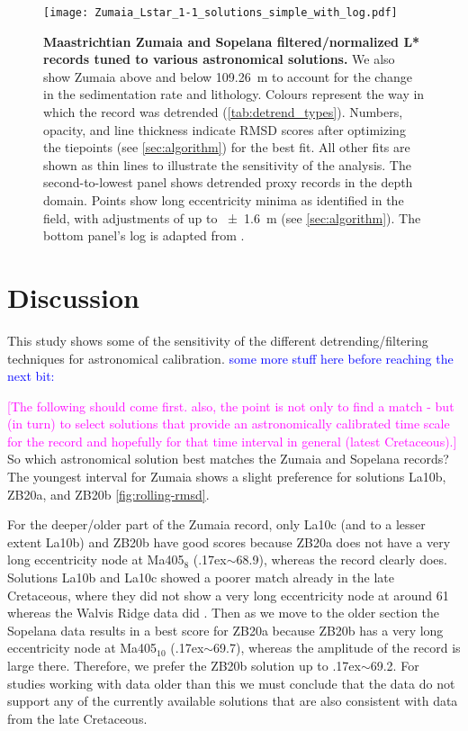 \documentclass[draft]{agujournal2019}
\newcommand{\appr}{\raise.17ex\hbox{$\scriptstyle\sim$}} %
\newcommand{\rez}{\textcolor{magenta}}
\newcommand{\ijk}{\textcolor{blue}}
\begin{document}
\begin{figure}[htb]
  \centering
  \texttt{[image: Zumaia\_Lstar\_1-1\_solutions\_simple\_with\_log.pdf]}
  \caption{\label{fig:rolling-depth-age}
    \textbf{Maastrichtian Zumaia and Sopelana filtered/normalized \gls{L*} records tuned to various astronomical solutions.}
    We also show Zumaia above and below \qty{109.26}{\metre} to account for the change in the sedimentation rate and lithology.
    Colours represent the way in which the record was detrended (\cref{tab:detrend_types}).
    Numbers, opacity, and line thickness indicate \gls{RMSD} scores after optimizing the tiepoints (see \cref{sec:algorithm}) for the best fit.
    All other fits are shown as thin lines to illustrate the sensitivity of the analysis.
    The second-to-lowest panel shows detrended proxy records in the depth domain.
    Points show long eccentricity minima as identified in the field, with adjustments of up to \qty{\pm1.6}{\metre} (see \cref{sec:algorithm}).
    The bottom panel's log is adapted from .
    }
\end{figure}




\section{Discussion}\label{sec:discussion}

This study shows some of the sensitivity of the different detrending/filtering techniques for astronomical calibration.
\ijk{some more stuff here before reaching the next bit:}

\rez{[The following should come first. also, the point is not only to find a match - but (in turn) to select solutions that provide an astronomically calibrated time scale for the record and hopefully for that time interval in general (latest Cretaceous).]}
So which astronomical solution best matches the Zumaia and Sopelana records?
The youngest interval for Zumaia shows a slight preference for solutions La10b, ZB20a, and ZB20b \cref{fig:rolling-rmsd}.

For the deeper/older part of the Zumaia record, only La10c (and to a lesser extent La10b) and ZB20b have good scores because ZB20a does not have a very long eccentricity node at Ma405\(_{8}\) (\appr\qty{68.9}{\millionyearago}), whereas the record clearly does.
Solutions La10b and La10c showed a poorer match already in the late Cretaceous, where they did not show a very long eccentricity node at around \qty{61}{\millionyearago} whereas the Walvis Ridge data did \cite{ZeebeLourens2022EPSL}.
Then as we move to the older section the Sopelana data results in a best score for ZB20a because ZB20b has a very long eccentricity node at Ma405\(_{10}\) (\appr\qty{69.7}{\millionyearago}), whereas the amplitude of the record is large there.
Therefore, we prefer the ZB20b solution up to \appr\qty{69.2}{\millionyearago}.
For studies working with data older than this we must conclude that the data do not support any of the currently available solutions that are also consistent with data from the late Cretaceous.
\end{document}
